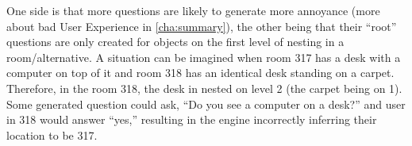 One side is that more questions are likely to generate more annoyance (more about bad User Experience in \cref{cha:summary}), the other being that their ``root'' questions are only created for objects on the first level of nesting in a room/alternative. A situation can be imagined when room 317 has a desk with a computer on top of it and room 318 has an identical desk standing on a carpet. Therefore, in the room 318, the desk in nested on level 2 (the carpet being on 1). Some generated question could ask, ``Do you see a computer on a desk?'' and user in 318 would answer ``yes,'' resulting in the engine incorrectly inferring their location to be 317.
